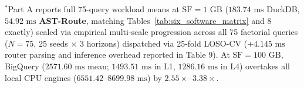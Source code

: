 \documentclass[10pt,a4paper]{article}
\begin{document}
\begin{table}[t!]
{\begin{tabular}{@{}llcccccccc@{}}
\bottomrule
\end{tabular}%
}
\vspace{2pt}
\parbox{\textwidth}{\scriptsize $^{*}$Part A reports full 75-query workload means at $\text{SF}=1\text{ GB}$ ($183.74\text{ ms}$ DuckDB, $54.92\text{ ms}$ \textbf{AST-Route}, matching Tables~\ref{tab:six_software_matrix} and 8 exactly) scaled via empirical multi-scale progression across all 75 factorial queries ($N=75$, 25 seeds $\times$ 3 horizons) dispatched via 25-fold LOSO-CV ($+4.145\text{ ms}$ router parsing and inference overhead reported in Table 9). At $\text{SF}=100\text{ GB}$, BigQuery ($2571.60\text{ ms}$ mean; $1493.51\text{ ms}$ in L1, $1286.16\text{ ms}$ in L4) overtakes all local CPU engines ($6551.42\text{--}8699.98\text{ ms}$) by $\mathbf{2.55\times\text{--}3.38\times}$.}
\end{table}
\end{document}
